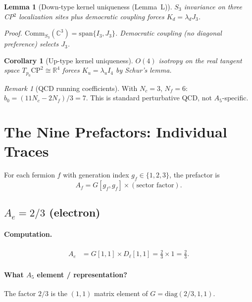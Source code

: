 \documentclass[11pt]{article}
\newtheorem{lemma}[theorem]{Lemma}
\newtheorem{corollary}[theorem]{Corollary}
\theoremstyle{remark}
\newtheorem*{remark}{Remark}
\begin{document}
\begin{lemma}[Down-type kernel uniqueness (Lemma~L)]\label{lem:kernel-down}
$S_3$ invariance on three CP$^2$ localization sites plus democratic coupling forces $K_d = \lambda_d J_3$.

\noindent\textit{Proof.}
$\mathrm{Comm}_{S_3}(\mathbb{C}^3) = \mathrm{span}\{I_3, J_3\}$.
Democratic coupling (no diagonal preference) selects $J_3$.
\end{lemma}

\begin{corollary}[Up-type kernel uniqueness]\label{cor:kernel-up}
$O(4)$ isotropy on the real tangent space $T_{p_0}\mathrm{CP}^2 \cong \mathbb{R}^4$ forces $K_u = \lambda_u I_4$ by Schur's lemma.
\end{corollary}

\begin{remark}[QCD running coefficients]
With $N_c = 3$, $N_f = 6$: $b_0 = (11 N_c - 2 N_f)/3 = 7$.
This is standard perturbative QCD, not $A_5$-specific.
\end{remark}

\section{The Nine Prefactors: Individual Traces}

For each fermion $f$ with generation index $g_f \in \{1,2,3\}$, the prefactor is
\[
A_f = G[g_f, g_f] \times (\text{sector factor}).
\]

\subsection{$A_e = 2/3$ \quad (electron)}

\paragraph{Computation.}
\begin{align}
A_e &= G[1,1] \times D_\ell[1,1] = \frac{2}{3} \times 1 = \frac{2}{3}.
\end{align}

\paragraph{What $A_5$ element / representation?}
The factor $2/3$ is the $(1,1)$ matrix element of $G = \mathrm{diag}(2/3, 1, 1)$.
\end{document}
